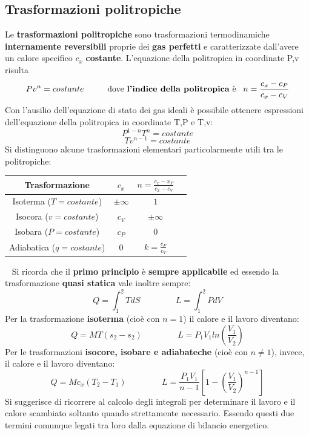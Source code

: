 \subsection{Trasformazioni politropiche}
Le \textbf{trasformazioni politropiche} sono trasformazioni termodinamiche \textbf{internamente reversibili}
proprie dei \textbf{gas perfetti} e caratterizzate dall’avere un calore specifico $c_x$ \textbf{costante}.\newline
\newline
L’equazione della politropica in coordinate P,v risulta
\[
    Pv^n = costante \;\;\;\;\;\;\;\;\;\;\text{dove \textbf{l'indice della politropica} è}\;\;\;n = \frac{c_x - c_P}{c_x - c_V}
\]
Con l’ausilio dell’equazione di stato dei gas ideali è possibile ottenere espressioni
dell’equazione della politropica in coordinate T,P e T,v: 
\[
    P^{1-n}T^n = costante
\]
\[
    Tv^{n-1} = costante
\]
Si distinguono alcune trasformazioni elementari particolarmente utili tra le politropiche: 
\begin{center}
    \begin{tabular}{ |c|c|c|c| } 
        \hline
        Trasformazione & $c_x$ & $n = \frac{c_x - x_P}{c_x - c_V}$ \\
        \hline
        Isoterma ($T = costante$) & $\pm \infty$ & $1$ \\ 
        Isocora ($v = costante$) & $c_V$ & $\pm \infty$\\ 
        Isobara ($P = costante$) & $c_P$ & $0$\\ 
        Adiabatica ($q = costante$) & $0$ & $k= \frac{c_P}{c_V}$\\ 
        \hline
    \end{tabular}
\end{center}
\ \newline
Si ricorda che il \textbf{primo principio} è \textbf{sempre applicabile} ed essendo la trasformazione \textbf{quasi statica} vale inoltre sempre:
\[
    Q = \int_{1}^{2}TdS \;\;\;\;\;\;\;\;\;\;\;\;\;\;\;L=\int_{1}^{2}PdV
\]
Per la trasformazione \textbf{isoterma} (cioè con $n = 1$) il calore e il lavoro diventano:
\[
    Q = MT(s_2-s_2) \;\;\;\;\;\;\;\;\;\;\;\;\;\;\; L = P_1V_1 ln \left(\frac{V_1}{V_2}\right)
\]
Per le trasformazioni \textbf{isocore, isobare e adiabateche} (cioè con $n \neq 1$), invece, il calore e il lavoro diventano:
\[
    Q= Mc_x (T_2-T_1) \;\;\;\;\;\;\;\;\;\;\;\;\;\;\; L = \frac{P_1V_1}{n-1}\left[ 1 - \left(\frac{V_1}{V_2}\right)^{n-1}\right]
\]
Si suggerisce di ricorrere al calcolo degli integrali per determinare il lavoro e il calore
scambiato soltanto quando strettamente necessario. Essendo questi due termini comunque
legati tra loro dalla equazione di bilancio energetico. 

